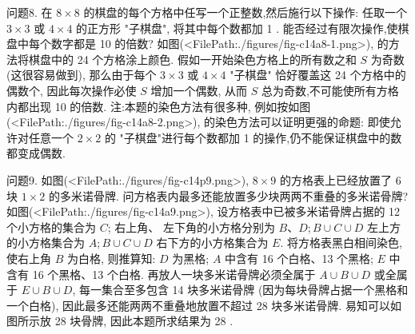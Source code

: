 问题8. 在 $8 \times 8$ 的棋盘的每个方格中任写一个正整数,然后施行以下操作: 任取一个 $3 \times 3$ 或 $4 \times 4$ 的正方形 "子棋盘", 将其中每个数都加 1 . 能否经过有限次操作,使棋盘中每个数字都是 10 的倍数?
如图(<FilePath:./figures/fig-c14a8-1.png>), 的方法将棋盘中的 24 个方格涂上颜色.
假如一开始染色方格上的所有数之和 $S$ 为奇数 (这很容易做到), 那么由于每个 $3 \times 3$ 或 $4 \times 4$ "子棋盘" 恰好覆盖这 24 个方格中的偶数个, 因此每次操作必使 $S$ 增加一个偶数, 从而 $S$ 总为奇数,不可能使所有方格内都出现 10 的倍数.
注:本题的染色方法有很多种, 例如按如图(<FilePath:./figures/fig-c14a8-2.png>), 的染色方法可以证明更强的命题: 即使允许对任意一个 $2 \times 2$ 的 "子棋盘"进行每个数都加 1 的操作,仍不能保证棋盘中的数都变成偶数.



问题9. 如图(<FilePath:./figures/fig-c14p9.png>), $8 \times 9$ 的方格表上已经放置了 6 块 $1 \times 2$ 的多米诺骨牌.
问方格表内最多还能放置多少块两两不重叠的多米诺骨牌?
如图(<FilePath:./figures/fig-c14a9.png>), 设方格表中已被多米诺骨牌占据的 12 个小方格的集合为 $C$; 右上角、 左下角的小方格分别为 $B 、 D ; B \cup C \cup D$ 左上方的小方格集合为 $A ; B \cup C \cup D$ 右下方的小方格集合为 $E$.
将方格表黑白相间染色, 使右上角 $B$ 为白格, 则推算知: $D$ 为黑格; $A$ 中含有 16 个白格、13 个黑格; $E$ 中含有 16 个黑格、13 个白格.
再放人一块多米诺骨牌必须全属于 $A \cup B \cup D$ 或全属于 $E \cup B \cup D$, 每一集合至多包含 14 块多米诺骨牌 (因为每块骨牌占据一个黑格和一个白格), 因此最多还能两两不重叠地放置不超过 28 块多米诺骨牌.
易知可以如图所示放 28 块骨牌, 因此本题所求结果为 28 .


